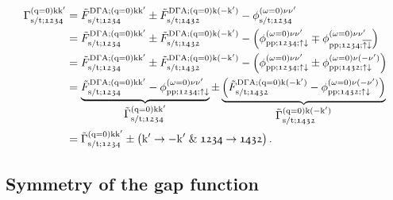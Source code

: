 \documentclass[\main/main.tex]{subfiles}
\begin{document}
\begin{align}\label{eq:pairing_vertex_full_formula}
\begin{split}
	\Gamma_{\text{s}/\text{t};\mathfrak{1234}}^{(\text{q}=0)\text{k}\text{k}'}&=\tilde{F}_{\text{s}/\text{t};\mathfrak{1234}}^{\text{D}\Gamma\text{A};(\text{q}=0)\text{k}\text{k}'}\pm \tilde{F}_{\text{s}/\text{t};\mathfrak{1432}}^{\text{D}\Gamma\text{A};(\text{q}=0)\text{k}(-\text{k}')}-\phi_{\text{s}/\text{t};\mathfrak{1234}}^{(\omega=0)\nu\nu'}\\
	&=\tilde{F}_{\text{s}/\text{t};\mathfrak{1234}}^{\text{D}\Gamma\text{A};(\text{q}=0)\text{k}\text{k}'}\pm \tilde{F}_{\text{s}/\text{t};\mathfrak{1432}}^{\text{D}\Gamma\text{A};(\text{q}=0)\text{k}(-\text{k}')}-\left (\phi_{\text{pp};\mathfrak{1234};\uparrow\downarrow}^{(\omega=0)\nu\nu'}\mp \phi_{\text{pp};\mathfrak{1234};\overline{\uparrow\downarrow}}^{(\omega=0)\nu\nu'}\right )\\
	&=\tilde{F}_{\text{s}/\text{t};\mathfrak{1234}}^{\text{D}\Gamma\text{A};(\text{q}=0)\text{k}\text{k}'}\pm \tilde{F}_{\text{s}/\text{t};\mathfrak{1432}}^{\text{D}\Gamma\text{A};(\text{q}=0)\text{k}(-\text{k}')}-\left (\phi_{\text{pp};\mathfrak{1234};\uparrow\downarrow}^{(\omega=0)\nu\nu'}\pm \phi_{\text{pp};\mathfrak{1432};\uparrow\downarrow}^{(\omega=0)\nu(-\nu')}\right )\\
	&=\underbrace{\tilde{F}_{\text{s}/\text{t};\mathfrak{1234}}^{\text{D}\Gamma\text{A};(\text{q}=0)\text{k}\text{k}'}-\phi_{\text{pp};\mathfrak{1234};\uparrow\downarrow}^{(\omega=0)\nu\nu'}}_{\textstyle\tilde{\Gamma}_{\text{s}/\text{t};\mathfrak{1234}}^{(\text{q}=0)\text{k}\text{k}'}}\pm \underbrace{\left (\tilde{F}_{\text{s}/\text{t};\mathfrak{1432}}^{\text{D}\Gamma\text{A};(\text{q}=0)\text{k}(-\text{k}')}- \phi_{\text{pp};\mathfrak{1432};\uparrow\downarrow}^{(\omega=0)\nu(-\nu')}\right )}_{\textstyle\tilde{\Gamma}_{\text{s}/\text{t};\mathfrak{1432}}^{(\text{q}=0)\text{k}(-\text{k}')}}\\
	&=\tilde{\Gamma}_{\text{s}/\text{t};\mathfrak{1234}}^{(\text{q}=0)\text{k}\text{k}'}\pm \left (\text{k}'\rightarrow -\text{k}'\;\&\; \mathfrak{1234}\rightarrow\mathfrak{1432}\right ).
\end{split}
\end{align}

\subsection{Symmetry of the gap function}
\end{document}
